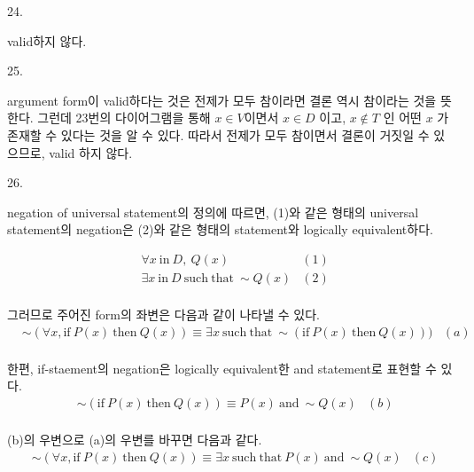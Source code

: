 \documentclass{article}
\begin{document}
24.
\begin{addmargin}[1em]{2em}
valid하지 않다.

\end{addmargin}
\bigskip

25.
\begin{addmargin}[1em]{2em}
argument form이 valid하다는 것은 전제가 모두 참이라면 결론 역시 참이라는 것을 뜻한다. 그런데 23번의 다이어그램을 통해 \(x \in V\)이면서 \(x \in D\) 이고,  \(x \notin T\) 인 어떤 \(x\) 가 존재할 수 있다는 것을 알 수 있다. 따라서 전제가 모두 참이면서 결론이 거짓일 수 있으므로, valid 하지 않다.

\end{addmargin}
\bigskip

26.
\begin{addmargin}[1em]{2em}
negation of universal statement의 정의에 따르면, (1)와 같은 형태의 universal statement의 negation은 (2)와 같은 형태의 statement와 logically equivalent하다.

\begin{align*}
&\forall x\mathrm{\ in\ }D,\ Q(x) &(1) \\
&\exists x\mathrm{\ in\ }D \mathrm{\ such\ that\ }\sim Q(x) &(2) \\
\end{align*}

그러므로 주어진 form의 좌변은 다음과 같이 나타낼 수 있다.
\begin{align*}
&\sim(\forall x,\mathrm{if\ }P(x)\mathrm{\ then\ }Q(x)) \equiv \exists x\mathrm{\ such\ that\ }\sim (\mathrm{if\ }P(x)\mathrm{\ then\ }Q(x))) &(a) \\
\end{align*}

한편, if-staement의 negation은 logically equivalent한 and statement로 표현할 수 있다.
\begin{align*}
&\sim(\mathrm{if\ }P(x)\mathrm{\ then\ }Q(x)) \equiv P(x)\mathrm{\ and\ }\sim Q(x) &(b) \\
\end{align*}

(b)의 우변으로 (a)의 우변를 바꾸면 다음과 같다.
\begin{align*}
&\sim(\forall x,\mathrm{if\ }P(x)\mathrm{\ then\ }Q(x)) \equiv \exists x\mathrm{\ such\ that\ }P(x)\mathrm{\ and\ }\sim Q(x) &(c) \\
\end{align*}
\end{addmargin}
\bigskip
\end{document}
